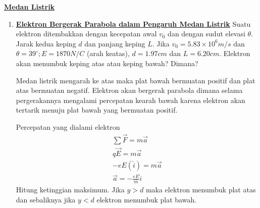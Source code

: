 \noindent \underline{\textbf{Medan Listrik}}
\vskip 10pt
\begin{enumerate}
    \item \underline{\textbf{Elektron Bergerak Parabola dalam Pengaruh Medan Listrik}}
    \vskip5pt
    Suatu elektron ditembakkan dengan kecepatan awal $v_0$ dan dengan sudut elevasi $\theta$. Jarak kedua keping $d$ dan panjang keping $L$. Jika $v_0 = 5.83\times 10^6 m/s$ dan $\theta = 39^{\circ} ; E= 1870N/C$ (arah keatas), $d=1.97cm$ dan $L=6.20 cm$. Elektron akan menumbuk keping atas atau keping bawah? Dimana?

    \begin{center}
    \end{center} 
    \pagebreak
    Medan listrik mengarah ke atas maka plat bawah bermuatan positif dan plat atas bermuatan negatif. Elektron akan bergerak parabola dimana selama pergerakannya mengalami percepatan kearah bawah karena elektron akan tertarik menuju plat bawah yang bermuatan positif.\\
    \begin{center}
    \end{center}
    Percepatan yang dialami elektron
    \begin{align*}
        \sum \vec{F}=m\vec{a}\\
        q\vec{E}=m\vec{a}\\
        -eE(\hat{i})=m\vec{a}\\
        \vec{a}=-\frac{eE}{m}\hat{i}
    \end{align*}
    Hitung ketinggian maksimum. Jika $y>d$ maka elektron menumbuk plat atas dan sebaliknya jika $y<d$ elektron menumbuk plat bawah.


\end{enumerate}
